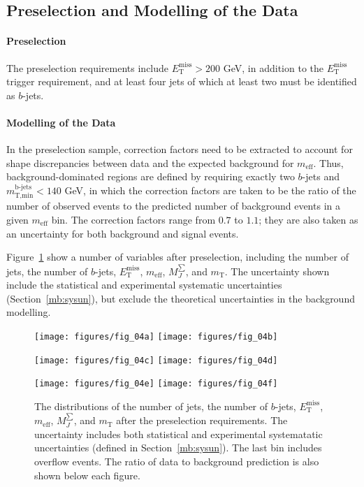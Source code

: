 \subsection{Preselection and Modelling of the Data}\label{mb:pres}

\paragraph{Preselection} The preselection requirements include
$E_{\text{T}}^{\text{miss}} > 200$ GeV, in addition to the
$E_{\text{T}}^{\text{miss}}$ trigger requirement, and at least four jets of
which at least two must be identified as $b$-jets.

\paragraph{Modelling of the Data} In the preselection sample, correction
factors need to be extracted to account for shape discrepancies between data
and the expected background for $m_{\text{eff}}$. Thus, background-dominated
regions are defined by requiring exactly two $b$-jets and
$m_{\text{T,min}}^{\text{b-jets}} < 140$ GeV, in which the correction factors
are taken to be the ratio of the number of observed events to the predicted
number of background events in a given $m_{\text{eff}}$ bin. The correction
factors range from $0.7$ to $1.1$; they are also taken as an uncertainty for
both background and signal events.

Figure~\ref{f:fig_04abcdef} show a number of variables after preselection,
including the number of jets, the number of $b$-jets,
$E_{\text{T}}^{\text{miss}}$, $m_{\text{eff}}$, $M_J^{\sum}$, and
$m_{\text{T}}$. The uncertainty shown include the statistical and experimental
systematic uncertainties (Section~\ref{mb:sysun}), but exclude the theoretical
uncertainties in the background modelling.

\begin{center}

	\begin{figure}[H]
		\texttt{[image: figures/fig\_04a]}
		\texttt{[image: figures/fig\_04b]}

		\texttt{[image: figures/fig\_04c]}
		\texttt{[image: figures/fig\_04d]}


		\texttt{[image: figures/fig\_04e]}
		\texttt{[image: figures/fig\_04f]}

		\caption{The distributions of the number of jets, the number of $b$-jets,
		$E_{\text{T}}^{\text{miss}}$, $m_{\text{eff}}$, $M_J^{\sum}$, and
		$m_{\text{T}}$ after the preselection requirements. The uncertainty
		includes both statistical and experimental systematatic uncertainties
		(defined in Section~\ref{mb:sysun}). The last bin includes overflow events.
		The ratio of data to background prediction is also shown below each
		figure.}

		\label{f:fig_04abcdef}

	\end{figure}

\end{center}

